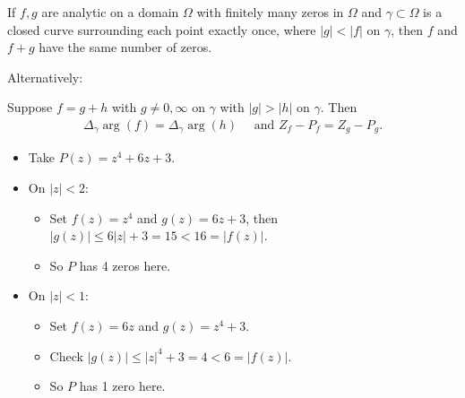 \begin{theorem}

If \(f, g\) are analytic on a domain \(\Omega\) with finitely many zeros
in \(\Omega\) and \(\gamma \subset \Omega\) is a closed curve
surrounding each point exactly once, where
\({\left\lvert {g} \right\rvert} < {\left\lvert {f} \right\rvert}\) on
\(\gamma\), then \(f\) and \(f+g\) have the same number of zeros.

Alternatively:

Suppose \(f = g + h\) with \(g \neq 0, \infty\) on \(\gamma\) with
\({\left\lvert {g} \right\rvert} > {\left\lvert {h} \right\rvert}\) on
\(\gamma\). Then
\begin{align*}\Delta_\gamma \arg(f) = \Delta_\gamma \arg(h)\quad\text{ and } Z_f - P_f = Z_g - P_g.\end{align*}

\end{theorem}

\begin{example}

\begin{itemize}
\tightlist
\item
  Take \(P(z) = z^4 + 6z + 3\).
\item
  On \({\left\lvert {z} \right\rvert} < 2\):

  \begin{itemize}
  \tightlist
  \item
    Set \(f(z) = z^4\) and \(g(z) = 6z + 3\), then
    \({\left\lvert {g(z)} \right\rvert} \leq 6{\left\lvert {z} \right\rvert} + 3 = 15 < 16= {\left\lvert {f(z)} \right\rvert}\).
  \item
    So \(P\) has 4 zeros here.
  \end{itemize}
\item
  On \({\left\lvert {z} \right\rvert} < 1\):

  \begin{itemize}
  \tightlist
  \item
    Set \(f(z) = 6z\) and \(g(z) = z^4 + 3\).
  \item
    Check
    \({\left\lvert {g(z)} \right\rvert} \leq {\left\lvert {z} \right\rvert}^4 + 3 = 4 < 6 = {\left\lvert {f(z)} \right\rvert}\).
  \item
    So \(P\) has 1 zero here.
  \end{itemize}
\end{itemize}

\end{example}

